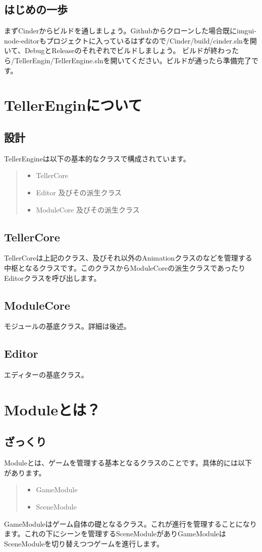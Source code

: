 \documentclass[12pt,a4j,uplatex]{jsarticle}
\begin{document}
\subsection{はじめの一歩}
まずCinderからビルドを通しましょう。Githubからクローンした場合既にimgui-node-editorもプロジェクトに入っているはずなので/Cinder/build/cinder.slnを開いて、DebugとReleaseのそれぞれでビルドしましょう。
ビルドが終わったら/TellerEngin/TellerEngine.slnを開いてください。ビルドが通ったら準備完了です。
\section{TellerEnginについて}
\subsection{設計}
TellerEngineは以下の基本的なクラスで構成されています。
\begin{quote}
  \begin{itemize}
    \item TellerCore
    \item Editor 及びその派生クラス
    \item ModuleCore 及びその派生クラス
  \end{itemize}
\end{quote}
\subsection{TellerCore}
TellerCoreは上記のクラス、及びそれ以外のAnimationクラスのなどを管理する中枢となるクラスです。このクラスからModuleCoreの派生クラスであったりEditorクラスを呼び出します。
\subsection{ModuleCore}
モジュールの基底クラス。詳細は後述。
\subsection{Editor}
エディターの基底クラス。
\section{Moduleとは？}
\subsection{ざっくり}
Moduleとは、ゲームを管理する基本となるクラスのことです。具体的には以下があります。
\begin{quote}
  \begin{itemize}
    \item GameModule
    \item SceneModule
  \end{itemize}
\end{quote}
GameModuleはゲーム自体の礎となるクラス。これが進行を管理することになります。これの下にシーンを管理するSceneModuleがありGameModuleはSceneModuleを切り替えつつゲームを進行します。
\end{document}
